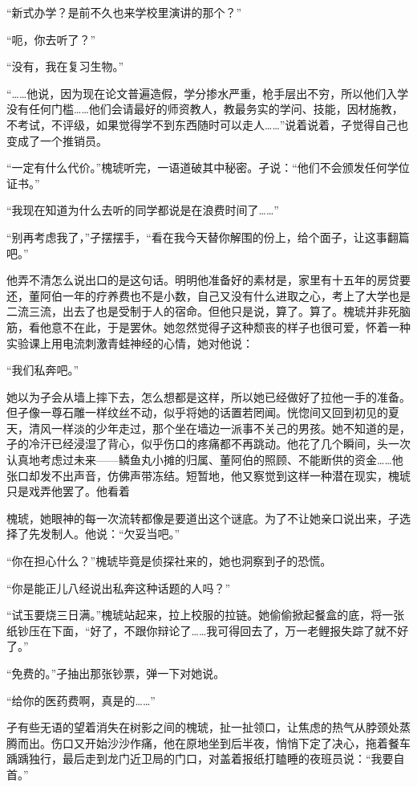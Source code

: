 \documentclass{article}
\begin{document}
“新式办学？是前不久也来学校里演讲的那个？”

“呃，你去听了？”

“没有，我在复习生物。”

“……他说，因为现在论文普遍造假，学分掺水严重，枪手层出不穷，所以他们入学没有任何门槛……他们会请最好的师资教人，教最务实的学问、技能，因材施教，不考试，不评级，如果觉得学不到东西随时可以走人……”说着说着，孑觉得自己也变成了一个推销员。

“一定有什么代价。”槐琥听完，一语道破其中秘密。孑说：“他们不会颁发任何学位证书。”

“我现在知道为什么去听的同学都说是在浪费时间了……”

\newpage 



“别再考虑我了，”孑摆摆手，“看在我今天替你解围的份上，给个面子，让这事翻篇吧。”

他弄不清怎么说出口的是这句话。明明他准备好的素材是，家里有十五年的房贷要还，董阿伯一年的疗养费也不是小数，自己又没有什么进取之心，考上了大学也是二流三流，出去了也是受制于人的宿命。但他只是说，算了。算了。槐琥并非死脑筋，看他意不在此，于是罢休。她忽然觉得孑这种颓丧的样子也很可爱，怀着一种实验课上用电流刺激青蛙神经的心情，她对他说：

“我们私奔吧。”

她以为孑会从墙上摔下去，怎么想都是这样，所以她已经做好了拉他一手的准备。但孑像一尊石雕一样纹丝不动，似乎将她的话置若罔闻。恍惚间又回到初见的夏天，清风一样淡的少年走过，那个坐在墙边一派事不关己的男孩。她不知道的是，孑的冷汗已经浸湿了背心，似乎伤口的疼痛都不再跳动。他花了几个瞬间，头一次认真地考虑过未来——鳞鱼丸小摊的归属、董阿伯的照顾、不能断供的资金……他张口却发不出声音，仿佛声带冻结。短暂地，他又察觉到这样一种潜在现实，槐琥只是戏弄他罢了。他看着

\newpage 

槐琥，她眼神的每一次流转都像是要道出这个谜底。为了不让她亲口说出来，孑选择了先发制人。他说：“欠妥当吧。”

“你在担心什么？”槐琥毕竟是侦探社来的，她也洞察到孑的恐慌。

“你是能正儿八经说出私奔这种话题的人吗？”

“试玉要烧三日满。”槐琥站起来，拉上校服的拉链。她偷偷掀起餐盒的底，将一张纸钞压在下面，“好了，不跟你辩论了……我可得回去了，万一老鲤报失踪了就不好了。”

“免费的。”孑抽出那张钞票，弹一下对她说。

“给你的医药费啊，真是的……”

孑有些无语的望着消失在树影之间的槐琥，扯一扯领口，让焦虑的热气从脖颈处蒸腾而出。伤口又开始沙沙作痛，他在原地坐到后半夜，悄悄下定了决心，拖着餐车踽踽独行，最后走到龙门近卫局的门口，对盖着报纸打瞌睡的夜班员说：“我要自首。”
\end{document}
